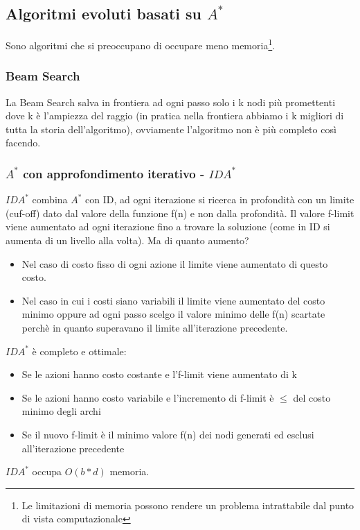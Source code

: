\documentclass{article}
\begin{document}
\subsection{Algoritmi evoluti basati su $A^*$}
Sono algoritmi che si preoccupano di occupare meno memoria\footnote{Le limitazioni di memoria possono rendere un problema intrattabile dal punto di vista computazionale}.

\subsubsection{Beam Search}
La Beam Search salva in frontiera ad ogni passo solo i k nodi più promettenti dove k è l'ampiezza del raggio (in pratica nella frontiera abbiamo i k migliori di tutta la storia dell'algoritmo), ovviamente l'algoritmo non è più completo così facendo.

\subsubsection{$A^*$ con approfondimento iterativo - $IDA^*$}
$IDA^*$ combina $A^*$ con ID, ad ogni iterazione si ricerca in profondità con un limite (cuf-off) dato dal valore della funzione f(n) e non dalla profondità. Il valore f-limit viene aumentato ad ogni iterazione fino a trovare la soluzione (come in ID si aumenta di un livello alla volta). Ma di quanto aumento? 
\begin{itemize}
    \item Nel caso di costo fisso di ogni azione il limite viene aumentato di questo costo.
    \item Nel caso in cui i costi siano variabili il limite viene aumentato del costo minimo oppure ad ogni passo scelgo il valore minimo delle f(n) scartate perchè in quanto superavano il limite all'iterazione precedente.
\end{itemize}
$IDA^*$ è completo e ottimale:
\begin{itemize}
    \item Se le azioni hanno costo costante e l'f-limit viene aumentato di k
    \item Se le azioni hanno costo variabile e l'incremento di f-limit è $\leq$ del costo minimo degli archi
    \item Se il nuovo f-limit è il minimo valore f(n) dei nodi generati ed esclusi all'iterazione precedente
\end{itemize}
$IDA^*$ occupa $O(b*d)$ memoria.
\clearpage
\end{document}
